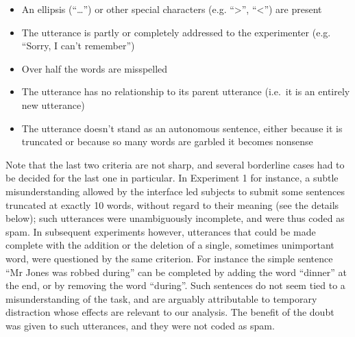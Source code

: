 \begin{itemize}
\item
  An ellipsis (\enquote{\ldots{}}) or other special characters (e.g.
  \enquote{\textgreater{}}, \enquote{\textless{}}) are present
\item
  The utterance is partly or completely addressed to the experimenter
  (e.g. \enquote{Sorry, I can't remember})
\item
  Over half the words are misspelled
\item
  The utterance has no relationship to its parent utterance (i.e.~it is
  an entirely new utterance)
\item
  The utterance doesn't stand as an autonomous sentence, either because
  it is truncated or because so many words are garbled it becomes
  nonsense
\end{itemize}

Note that the last two criteria are not sharp, and several borderline
cases had to be decided for the last one in particular. In Experiment 1
for instance, a subtle misunderstanding allowed by the interface led
subjects to submit some sentences truncated at exactly 10 words, without
regard to their meaning (see the details below); such utterances were
unambiguously incomplete, and were thus coded as spam. In subsequent
experiments however, utterances that could be made complete with the
addition or the deletion of a single, sometimes unimportant word, were
questioned by the same criterion. For instance the simple sentence
\enquote{Mr Jones was robbed during} can be completed by adding the word
\enquote{dinner} at the end, or by removing the word \enquote{during}.
Such sentences do not seem tied to a misunderstanding of the task, and
are arguably attributable to temporary distraction whose effects are
relevant to our analysis. The benefit of the doubt was given to such
utterances, and they were not coded as spam.

